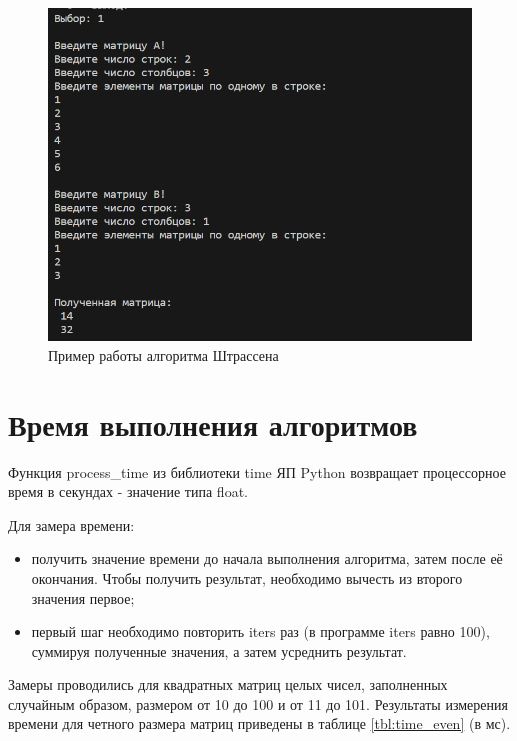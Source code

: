 \begin{figure}[H]
	\begin{center}
		\includegraphics[scale=0.8]{img/example.png}
	\end{center}
	\captionsetup{justification=centering}
	\caption{Пример работы алгоритма Штрассена}
	\label{img:example2}
\end{figure}

\section{Время выполнения алгоритмов}

Функция process\_time из библиотеки time ЯП Python возвращает  процессорное время в секундах - значение типа float.

Для замера времени:
\begin{itemize}
	\item получить значение времени до начала выполнения алгоритма, затем после её окончания. Чтобы получить результат, необходимо вычесть из второго значения первое;
	\item первый шаг необходимо повторить iters раз (в программе iters равно 100), суммируя полученные значения, а затем усреднить результат.
\end{itemize}

Замеры проводились для квадратных матриц целых чисел, заполненных случайным образом, размером от 10 до 100 и от 11 до 101. Результаты измерения времени для четного размера матриц приведены в таблице \ref{tbl:time_even} (в мс).

